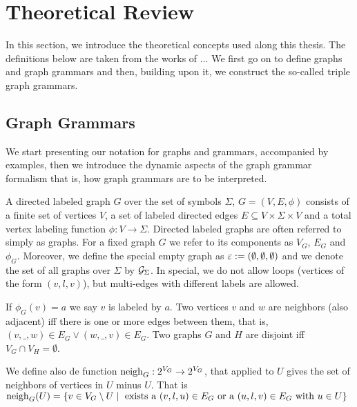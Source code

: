 \documentclass[]{report}
\begin{document}
\section{Theoretical Review}
In this section, we introduce the theoretical concepts used along this thesis. The definitions below are taken from the works of ...%
We first go on to define graphs and graph grammars and then, building upon it, we construct the so-called triple graph grammars.


\subsection{Graph Grammars}
We start presenting our notation for graphs and grammars, accompanied by examples, then we introduce the dynamic aspects of the graph grammar formalism that is, how graph grammars are to be interpreted.


\begin{definition}
	\label{def:graph}
	A directed labeled graph $G$ over the set of symbols $\Sigma$, $G = (V, E, \phi)$ consists of a finite set of vertices $V$, a set of labeled directed edges $E \subseteq V \times \Sigma \times V$ and a total vertex labeling function $\phi : V \to \Sigma$. Directed labeled graphs are often referred to simply as graphs. For a fixed graph $G$ we refer to its components as $V_G$, $E_G$ and $\phi_G$. Moreover, we define the special empty graph as $\varepsilon := (\emptyset, \emptyset, \emptyset)$ and we denote the set of all graphs over $\Sigma$ by $\mathcal{G}_{\Sigma}$. In special, we do not allow loops (vertices of the form $(v,l,v)$), but multi-edges with different labels are allowed.
	
	If $\phi_G(v) = a$ we say $v$ is labeled by $a$. Two vertices $v$ and $w$ are neighbors (also adjacent) iff there is one or more edges between them, that is, $(v,\_,w) \in E_G \lor (w,\_,v) \in E_G$. Two graphs $G$ and $H$ are disjoint iff $V_G \cap V_H = \emptyset$.
	
	We define also de function $\operatorname{neigh}_{G}: 2^{V_G} \to 2^{V_G}$, that applied to $U$ gives the set of neighbors of vertices in $U$ minus $U$. That is $\operatorname{neigh}_{G}(U) = \{ v \in V_G \setminus U \; | \; \text{ exists a } (v,l,u) \in E_G \text{ or a } (u,l,v) \in E_G \text{ with } u \in U \}$
\end{definition}
\end{document}
